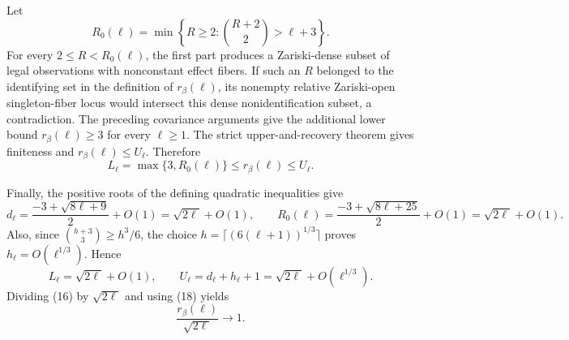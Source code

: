 Let
\[
 R_0(\ell)=\min\left\{R\ge2:\binom{R+2}{2}>\ell+3\right\}.
\]
For every \(2\le R<R_0(\ell)\), the first part produces a Zariski-dense subset of legal observations with nonconstant effect fibers.  If such an \(R\) belonged to the identifying set in the definition of \(r_\beta(\ell)\), its nonempty relative Zariski-open singleton-fiber locus would intersect this dense nonidentification subset, a contradiction.  The preceding covariance arguments give the additional lower bound \(r_\beta(\ell)\ge3\) for every \(\ell\ge1\).  The strict upper-and-recovery theorem gives finiteness and \(r_\beta(\ell)\le U_\ell\).  Therefore
\[
 L_\ell=\max\{3,R_0(\ell)\}
 \le r_\beta(\ell)\le U_\ell.
 \tag{16}
\]

Finally, the positive roots of the defining quadratic inequalities give
\[
 d_\ell=\frac{-3+\sqrt{8\ell+9}}{2}+O(1)
          =\sqrt{2\ell}+O(1),
 \qquad
 R_0(\ell)=\frac{-3+\sqrt{8\ell+25}}{2}+O(1)
          =\sqrt{2\ell}+O(1).
 \tag{17}
\]
Also, since \(\binom{h+3}{3}\ge h^3/6\), the choice \(h=\lceil(6(\ell+1))^{1/3}\rceil\) proves \(h_\ell=O(\ell^{1/3})\).  Hence
\[
 L_\ell=\sqrt{2\ell}+O(1),
 \qquad
 U_\ell=d_\ell+h_\ell+1
       =\sqrt{2\ell}+O(\ell^{1/3}).
 \tag{18}
\]
Dividing (16) by \(\sqrt{2\ell}\) and using (18) yields
\[
 \frac{r_\beta(\ell)}{\sqrt{2\ell}}\longrightarrow1.
\]
